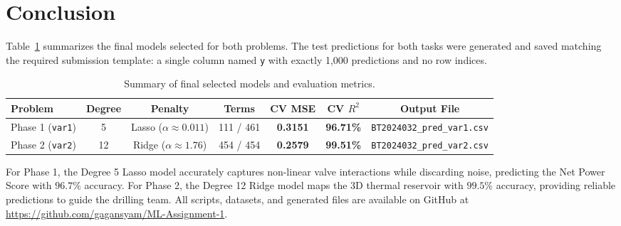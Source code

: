 \documentclass[11pt,a4paper]{article}
\begin{document}
\section{Conclusion}
Table~\ref{tab:summary} summarizes the final models selected for both problems. The test predictions for both tasks were generated and saved matching the required submission template: a single column named \texttt{y} with exactly 1,000 predictions and no row indices.

\begin{table}[htbp]
\centering
\small
\setlength{\tabcolsep}{3.5pt}
\caption{Summary of final selected models and evaluation metrics.}
\label{tab:summary}
\begin{tabular}{lcccccc}
\toprule
Problem & Degree & Penalty & Terms & CV MSE & CV $R^2$ & Output File \\
\midrule
Phase 1 (\texttt{var1}) & 5  & Lasso ($\alpha \approx 0.011$) & 111 / 461 & \textbf{0.3151} & \textbf{96.71\%} & \texttt{BT2024032\_pred\_var1.csv} \\
Phase 2 (\texttt{var2}) & 12 & Ridge ($\alpha \approx 1.76$)  & 454 / 454 & \textbf{0.2579} & \textbf{99.51\%} & \texttt{BT2024032\_pred\_var2.csv} \\
\bottomrule
\end{tabular}
\end{table}

For Phase 1, the Degree 5 Lasso model accurately captures non-linear valve interactions while discarding noise, predicting the Net Power Score with $96.7\%$ accuracy. For Phase 2, the Degree 12 Ridge model maps the 3D thermal reservoir with $99.5\%$ accuracy, providing reliable predictions to guide the drilling team. All scripts, datasets, and generated files are available on GitHub at \url{https://github.com/gagansyam/ML-Assignment-1}.
\end{document}
